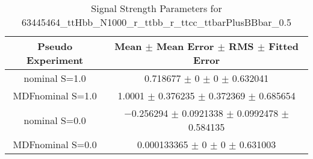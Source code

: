 \begin{table}
\centering
\caption{Signal Strength Parameters for 63445464\_ttHbb\_N1000\_r\_ttbb\_r\_ttcc\_ttbarPlusBBbar\_0.5}
\begin{tabular}{cc}
\toprule
Pseudo Experiment & Mean $\pm$ Mean Error $\pm$ RMS $\pm$ Fitted Error\\
\midrule
nominal S=1.0 & \num{0.718677} $\pm$ \num{0} $\pm$ \num{0} $\pm$ \num{0.632041}\\
MDFnominal S=1.0 & \num{1.0001} $\pm$ \num{0.376235} $\pm$ \num{0.372369} $\pm$ \num{0.685654}\\
nominal S=0.0 & \num{-0.256294} $\pm$ \num{0.0921338} $\pm$ \num{0.0992478} $\pm$ \num{0.584135}\\
MDFnominal S=0.0 & \num{0.000133365} $\pm$ \num{0} $\pm$ \num{0} $\pm$ \num{0.631003}\\
\bottomrule
\end{tabular}
\end{table}